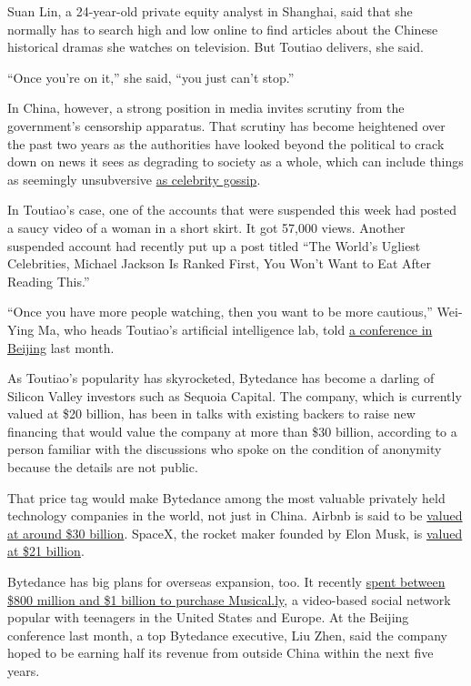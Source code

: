 Suan Lin, a 24-year-old private equity analyst in Shanghai, said that
she normally has to search high and low online to find articles about
the Chinese historical dramas she watches on television. But Toutiao
delivers, she said.

``Once you're on it,'' she said, ``you just can't stop.''

In China, however, a strong position in media invites scrutiny from the
government's censorship apparatus. That scrutiny has become heightened
over the past two years as the authorities have looked beyond the
political to crack down on news it sees as degrading to society as a
whole, which can include things as seemingly unsubversive
\href{https://www.nytimes.com/2017/06/09/world/asia/china-celebrity-news-wechat.html}{as
celebrity gossip}.

In Toutiao's case, one of the accounts that were suspended this week had
posted a saucy video of a woman in a short skirt. It got 57,000 views.
Another suspended account had recently put up a post titled ``The
World's Ugliest Celebrities, Michael Jackson Is Ranked First, You Won't
Want to Eat After Reading This.''

``Once you have more people watching, then you want to be more
cautious,'' Wei-Ying Ma, who heads Toutiao's artificial intelligence
lab, told \href{http://aideas.toutiao.com/index.html}{a conference in
Beijing} last month.

As Toutiao's popularity has skyrocketed, Bytedance has become a darling
of Silicon Valley investors such as Sequoia Capital. The company, which
is currently valued at \$20 billion, has been in talks with existing
backers to raise new financing that would value the company at more than
\$30 billion, according to a person familiar with the discussions who
spoke on the condition of anonymity because the details are not public.

That price tag would make Bytedance among the most valuable privately
held technology companies in the world, not just in China. Airbnb is
said to be
\href{https://www.nytimes.com/2017/03/09/technology/airbnb-1-billion-funding.html}{valued
at around \$30 billion}. SpaceX, the rocket maker founded by Elon Musk,
is
\href{https://www.nytimes.com/2017/07/27/technology/spacex-is-now-one-of-the-worlds-most-valuable-privately-held-companies.html}{valued
at \$21 billion}.

Bytedance has big plans for overseas expansion, too. It recently
\href{https://www.nytimes.com/2017/11/10/business/dealbook/musically-sold-app-video.html}{spent
between \$800 million and \$1 billion to purchase Musical.ly}, a
video-based social network popular with teenagers in the United States
and Europe. At the Beijing conference last month, a top Bytedance
executive, Liu Zhen, said the company hoped to be earning half its
revenue from outside China within the next five years.

